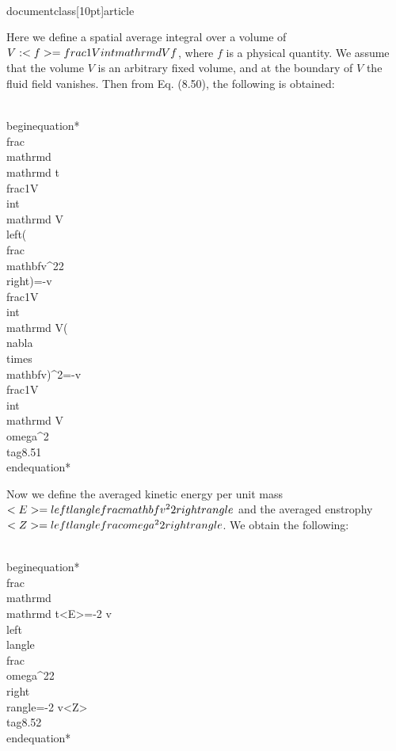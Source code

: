 \\documentclass[10pt]{article}
\begin{document}
{{{{{Here we define a spatial average integral over a volume of $V:<f>=\\frac{1}{V} \\int \\mathrm{d} V f$, where $f$ is a physical quantity. We assume that the volume $V$ is an arbitrary fixed volume, and at the boundary of $V$ the fluid field vanishes. Then from Eq. (8.50), the following is obtained:


\\begin{equation*}
\\frac{\\mathrm{d}}{\\mathrm{d} t} \\frac{1}{V} \\int \\mathrm{d} V\\left(\\frac{\\mathbf{v}^{2}}{2}\\right)=-v \\frac{1}{V} \\int \\mathrm{d} V(\\nabla \\times \\mathbf{v})^{2}=-v \\frac{1}{V} \\int \\mathrm{d} V \\omega^{2} \\tag{8.51}
\\end{equation*}


Now we define the averaged kinetic energy per unit mass $<E>=\\left\\langle\\frac{\\mathbf{v}^{2}}{2}\\right\\rangle$ and the averaged enstrophy $<Z>=\\left\\langle\\frac{\\omega^{2}}{2}\\right\\rangle$. We obtain the following:


\\begin{equation*}
\\frac{\\mathrm{d}}{\\mathrm{d} t}<E>=-2 v\\left\\langle\\frac{\\omega^{2}}{2}\\right\\rangle=-2 v<Z> \\tag{8.52}
\\end{equation*}


}}}}}
\end{document}
